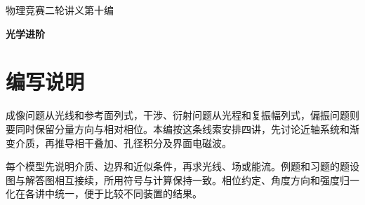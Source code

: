 \documentclass[UTF8,11pt,twoside,openany]{ctexbook}
\begin{document}
\frontmatter
\begin{titlepage}\centering\vspace*{28mm}
{\Large 物理竞赛二轮讲义\quad 第十编\par}\vspace{8mm}
{\Huge\bfseries 光学进阶\par}\vspace{12mm}{\Large 物理竞赛二轮讲义\par}\vfill\end{titlepage}
\chapter*{编写说明}
成像问题从光线和参考面列式，干涉、衍射问题从光程和复振幅列式，偏振问题则要同时保留分量方向与相对相位。本编按这条线索安排四讲，先讨论近轴系统和渐变介质，再推导相干叠加、孔径积分及界面电磁波。

每个模型先说明介质、边界和近似条件，再求光线、场或能流。例题和习题的题设图与解答图相互接续，所用符号与计算保持一致。相位约定、角度方向和强度归一化在各讲中统一，便于比较不同装置的结果。
\tableofcontents
\mainmatter




\end{document}
